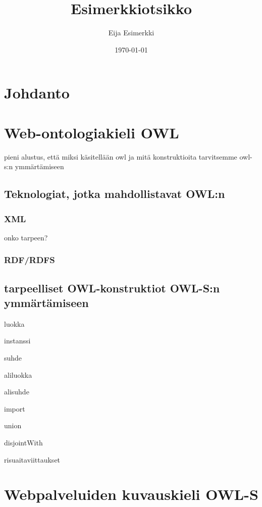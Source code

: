 \documentclass[finnish]{tktltiki2}
\title{Esimerkkiotsikko}
\author{Eija Esimerkki}
\date{\today}
\theoremstyle{definition}
\theoremstyle{remark}
\begin{document}

\maketitle        %
\makeabstract     %

\tableofcontents  %
\newpage          %



\section{Johdanto}
\section{Web-ontologiakieli OWL}

pieni alustus, että miksi käsitellään owl ja mitä konstruktioita tarvitsemme owl-s:n ymmärtämiseen

\subsection{Teknologiat, jotka mahdollistavat OWL:n}
\subsubsection{XML}

onko tarpeen?

\subsubsection{RDF/RDFS}

\subsection{tarpeelliset OWL-konstruktiot OWL-S:n ymmärtämiseen}

luokka

instanssi

suhde

aliluokka

alisuhde

import

union

disjointWith

risuaitaviittaukset


\section{Webpalveluiden kuvauskieli OWL-S}
\end{document}
